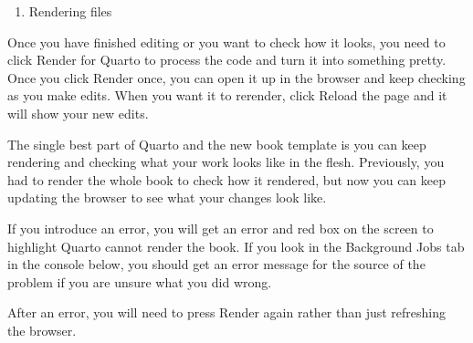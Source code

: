 \documentclass[
  letterpaper,
  DIV=11,
  numbers=noendperiod]{scrreprt}
\providecommand{\tightlist}{%
  \setlength{\itemsep}{0pt}\setlength{\parskip}{0pt}}\usepackage{longtable,booktabs,array}
\begin{document}
\begin{enumerate}
\def\labelenumi{\arabic{enumi}.}
\setcounter{enumi}{7}
\tightlist
\item
  Rendering files
\end{enumerate}

Once you have finished editing or you want to check how it looks, you
need to click Render for Quarto to process the code and turn it into
something pretty. Once you click Render once, you can open it up in the
browser and keep checking as you make edits. When you want it to
rerender, click Reload the page and it will show your new edits.

\begin{tcolorbox}[enhanced jigsaw, colbacktitle=quarto-callout-tip-color!10!white, titlerule=0mm, leftrule=.75mm, title=\textcolor{quarto-callout-tip-color}{\faLightbulb}\hspace{0.5em}{Tip}, breakable, bottomrule=.15mm, opacitybacktitle=0.6, rightrule=.15mm, opacityback=0, arc=.35mm, colframe=quarto-callout-tip-color-frame, toptitle=1mm, bottomtitle=1mm, toprule=.15mm, left=2mm, colback=white, coltitle=black]

The single best part of Quarto and the new book template is you can keep
rendering and checking what your work looks like in the flesh.
Previously, you had to render the whole book to check how it rendered,
but now you can keep updating the browser to see what your changes look
like.

\end{tcolorbox}

\begin{tcolorbox}[enhanced jigsaw, colbacktitle=quarto-callout-caution-color!10!white, titlerule=0mm, leftrule=.75mm, title=\textcolor{quarto-callout-caution-color}{\faFire}\hspace{0.5em}{Caution}, breakable, bottomrule=.15mm, opacitybacktitle=0.6, rightrule=.15mm, opacityback=0, arc=.35mm, colframe=quarto-callout-caution-color-frame, toptitle=1mm, bottomtitle=1mm, toprule=.15mm, left=2mm, colback=white, coltitle=black]

If you introduce an error, you will get an error and red box on the
screen to highlight Quarto cannot render the book. If you look in the
Background Jobs tab in the console below, you should get an error
message for the source of the problem if you are unsure what you did
wrong.

After an error, you will need to press Render again rather than just
refreshing the browser.

\end{tcolorbox}
\end{document}
